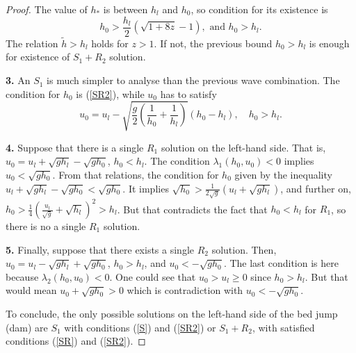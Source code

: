 \documentclass[10pt,a4paper]{amsart}
\begin{document}
\begin{proof}
The value of $h_{\ast}$ is between $h_{l}$ and $h_{0}$, so condition
for its existence is  
\begin{equation*} 
h_{0} > \frac{h_l}{2}\left( \sqrt{1+8z} - 1 \right), \text{ and } h_{0}>h_{l}.
\end{equation*}
The relation $\tilde{h}>h_{l}$ holds for
$z > 1$. If not, the previous bound 
$h_{0}>h_{l}$ is enough for existence of $S_{1}+R_{2}$ solution.

\noindent \textbf{3.}
An $S_{1}$ is much simpler to analyse than 
the previous wave combination. 
The condition for $h_{0}$ is (\ref{SR2}), while $u_{0}$ has to satisfy  
\begin{equation*} 
u_{0} = u_{l} - \sqrt{\frac{g}{2} \left( \frac{1}{h_{0}}+\frac{1}{h_{l}} \right)}
\left( h_{0} - h_{l} \right), \quad h_{0} > h_{l}.
\end{equation*}

\noindent \textbf{4.}
Suppose that there is a single $R_{1}$ solution on the left-hand 
side. That is,  
\(u_{0} = u_{l} + \sqrt{gh_{l}} - \sqrt{gh_{0}}\), \(h_{0}<h_{l}\). 
The condition $\lambda_{1}(h_{0},u_{0})<0$ implies  
\(u_{0} < \sqrt{gh_{0}}\).
From that relations, the condition for \(h_{0}\) given by 
the inequality 
\( u_{l} + \sqrt{gh_{l}} - \sqrt{gh_{0}} < \sqrt{gh_{0}}\). 
It implies \(\sqrt{h_{0}} > \frac{1}{2\sqrt{g}}(u_{l} + \sqrt{gh_{l}})\),
and further on, 
\(h_{0} > \frac{1}{4}\left( \frac{u_{l}}{\sqrt{g}} + \sqrt{h_{l}} \right)^{2} > h_{l}\).
But that contradicts the fact that \(h_{0}<h_{l}\) for $R_1$, so there is no
a single $R_{1}$ solution.

\noindent \textbf{5.}
Finally, suppose that there exists a single $R_{2}$ solution. Then,
\(u_{0} = u_{l} - \sqrt{gh_{l}} + \sqrt{gh_{0}}\), \(h_{0}>h_{l}\),
and \(u_{0} < -\sqrt{gh_{0}}\). The last condition is here because
$\lambda_{2}(h_{0},u_{0})<0$. One could see that $u_{0}>u_{l} \geq 0$ 
since $h_{0}>h_{l}$. But that would mean $u_{0}+\sqrt{gh_{0}}>0$ which
is contradiction with $u_{0}<-\sqrt{gh_{0}}$.

To conclude, the only possible solutions on the left-hand
side of the bed jump (dam) are
\(S_{1}\) with conditions (\ref{S}) and (\ref{SR2}) or 
\(S_{1}+R_{2}\), with satisfied conditions (\ref{SR}) and (\ref{SR2}).
\end{proof}
\end{document}
